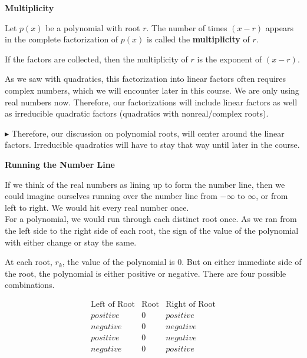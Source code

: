 \documentclass{ximera}
\begin{document}
\begin{definition} \textbf{\textcolor{green!50!black}{Multiplicity}} 

Let $p(x)$ be a polynomial with root $r$.  The number of times $(x - r)$ appears in the complete factorization of $p(x)$ is called the \textbf{multiplicity} of $r$.

If the factors are collected, then the multiplicity of $r$ is the exponent of $(x-r)$.

\end{definition}

As we saw with quadratics, this factorization into linear factors often requires complex numbers, which we will encounter later in this course. We are only using real numbers now.  Therefore, our factorizations will include linear factors as well as irreducible quadratic factors (quadratics with nonreal/complex roots).


\textbf{\textcolor{red!70!darkgray}{$\blacktriangleright$}}  Therefore, our discussion on polynomial roots, will center around the linear factors.  Irreducible quadratics will have to stay that way until later in the course.









\textbf{\large Running the Number Line}

If we think of the real numbers as lining up to form the number line, then we could imagine ourselves running over the number line from $-\infty$ to $\infty$, or from left to right.  We would hit every real number once.  \\

For a polynomial, we would run through each distinct root once.  As we ran from the left side to the right side of each root, the sign of the value of the polynomial with either change or stay the same.

At each root, $r_k$, the value of the polynomial is $0$.  But on either immediate side of the root, the polynomial is either positive or negative. There are four possible combinations.


\[
\begin{array}{rcl}
\text{Left of Root}  & \text{Root}  & \text{Right of Root} \\
positive & 0 & positive \\
negative & 0 & negative \\
positive & 0 & negative \\
negative & 0 & positive
\end{array}
\]
\end{document}
